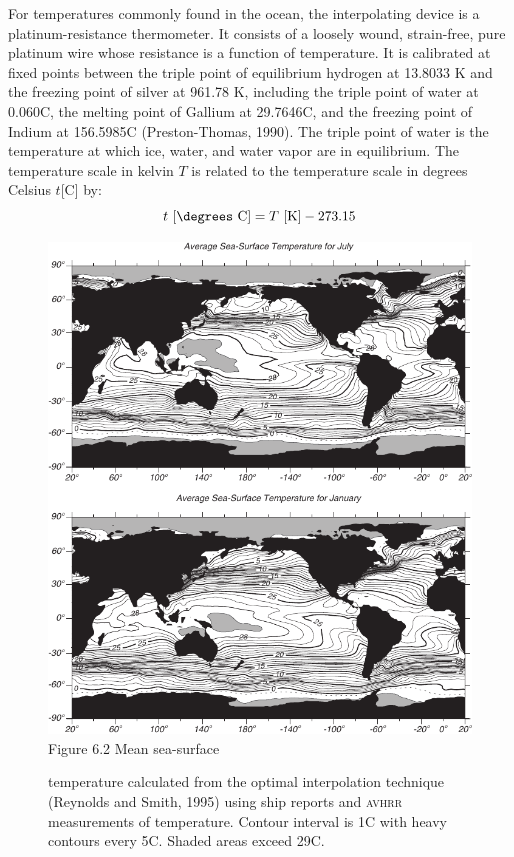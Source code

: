 For temperatures commonly found in the ocean, the interpolating device
is a platinum-resistance thermometer. It consists of a loosely wound,
strain-free, pure platinum wire whose resistance is a function of
temperature. It is calibrated at fixed points between the triple point
of equilibrium hydrogen at 13.8033 K and the freezing point of silver
at 961.78 K, including the triple point of water at 0.060\degrees C,
the melting point of Gallium at 29.7646\degrees C, and the freezing
point of Indium at 156.5985\degrees C (Preston-Thomas, 1990). The
triple point of water is the temperature at which ice, water, and
water vapor are in equilibrium. The temperature scale in kelvin $T$ is
related to the temperature scale in degrees Celsius $t$[\degrees C]
by:
\begin{equation}
t \text{ [\degrees C]} = T \text{ [K]} -273.15
\end{equation}

\begin{figure}[t!]
\includegraphics{pics/sst_climatology}
\footnotesize
Figure 6.2 Mean sea-surface \rule{0mm}{3ex}temperature calculated from
the optimal interpolation technique (Reynolds and Smith, 1995) using
ship reports and \textsc{avhrr} measurements of temperature. Contour
interval is 1\degrees C with heavy contours every 5\degrees C. Shaded
areas exceed 29\degrees C.
\label{fig:sst_climatology}
\vspace{-4ex}
\end{figure}

